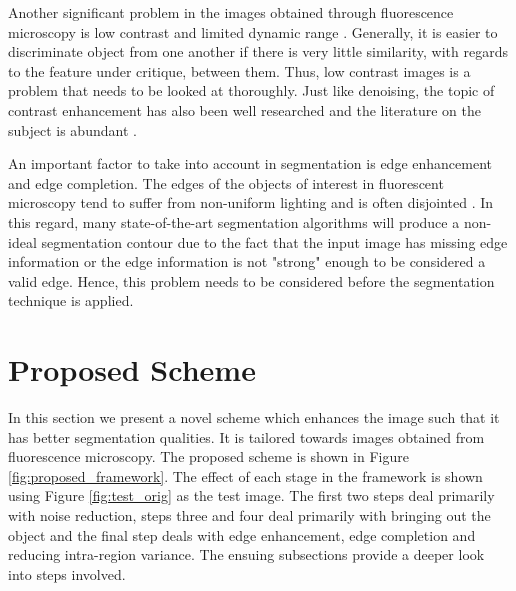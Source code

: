 \documentclass[a4paper,11pt]{ijamas}
\begin{document}
Another significant problem in the images obtained through fluorescence microscopy is low contrast and limited dynamic range \cite{olympusmicro1:2012}. Generally, it is easier to discriminate object from one another if there is very little similarity, with regards to the feature under critique, between them. Thus, low contrast images is a problem that needs to be looked at thoroughly. Just like denoising, the topic of contrast enhancement has also been well researched and the literature on the subject is abundant \cite{khellaf:1991,stark:2000,starck:2003,celik:2012,mukherjee:2009}.

An important factor to take into account in segmentation is edge enhancement and edge completion. The edges of the objects of interest in fluorescent microscopy tend to suffer from non-uniform lighting and is often disjointed \cite{olympusmicro2:2012}. In this regard, many state-of-the-art segmentation algorithms will produce a non-ideal segmentation contour due to the fact that the input image has missing edge information or the edge information is not "strong" enough to be considered a valid edge. Hence, this problem needs to be considered before the segmentation technique is applied.

\section{Proposed Scheme}
\label{sec:proposed}
In this section we present a novel scheme which enhances the image such that it has better segmentation qualities. It is tailored towards images obtained from fluorescence microscopy. The proposed scheme is shown in Figure \ref{fig:proposed_framework}. The effect of each stage in the framework is shown using Figure \ref{fig:test_orig} as the test image. The first two steps deal primarily with noise reduction, steps three and four deal primarily with bringing out the object and the final step deals with edge enhancement, edge completion and reducing intra-region variance. The ensuing subsections provide a deeper look into steps involved.
\end{document}
